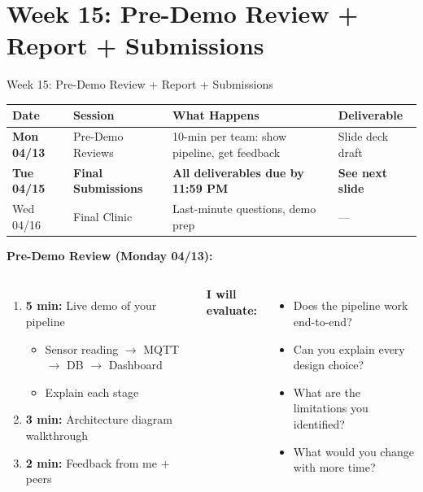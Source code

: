 \documentclass[aspectratio=169,11pt]{beamer}
\begin{document}
\section{Week 15: Pre-Demo Review + Report + Submissions}

\begin{frame}{Week 15: Pre-Demo Review + Report + Submissions}
    \begin{center}
    \footnotesize
    \begin{tabular}{llll}
        \toprule
        \textbf{Date} & \textbf{Session} & \textbf{What Happens} & \textbf{Deliverable} \\
        \midrule
        \textbf{Mon 04/13} & Pre-Demo Reviews & 10-min per team: show pipeline, get feedback & Slide deck draft \\
        \textbf{Tue 04/15} & \textbf{Final Submissions} & \textbf{All deliverables due by 11:59 PM} & \textbf{See next slide} \\
        Wed 04/16 & Final Clinic & Last-minute questions, demo prep & --- \\
        \bottomrule
    \end{tabular}
    \normalsize
    \end{center}

    \vspace{0.2cm}
    \textbf{Pre-Demo Review (Monday 04/13):}
    \begin{columns}
        \begin{enumerate}
            \item \textbf{5 min:} Live demo of your pipeline
            \begin{itemize}
                \item Sensor reading $\rightarrow$ MQTT $\rightarrow$ DB $\rightarrow$ Dashboard
                \item Explain each stage
            \end{itemize}
            \item \textbf{3 min:} Architecture diagram walkthrough
            \item \textbf{2 min:} Feedback from me + peers
        \end{enumerate}

        \textbf{I will evaluate:}
        \begin{itemize}
            \item Does the pipeline work end-to-end?
            \item Can you explain every design choice?
            \item What are the limitations you identified?
            \item What would you change with more time?
        \end{itemize}


\end{columns}
\end{frame}
\end{document}
